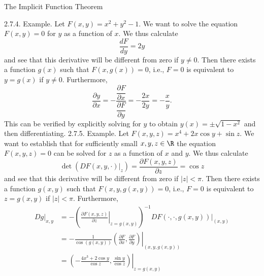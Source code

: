 \documentclass[smaller,hyperref={CJKbookmarks=true}]{beamer}
\begin{document}
\begin{frame}{The Implicit Function Theorem}
\begin{spacing}{1}
\alert{2.7.4. Example.} Let $F(x,y)=x^2+y^2-1$. We want to solve the equation $F(x,y)=0$ for $y$ as a function of $x$. We thus calculate
\[\frac{dF}{dy}=2y\]
and see that this derivative will be dif{}ferent from zero if $y\neq0$. Then there exists a function $g(x)$ such that $F(x,g(x))=0$, i.e., $F=0$ is equivalent to $y=g(x)$ if $y\neq0$. Furthermore,
\[\frac{\partial y}{\partial x}=-\frac{\dfrac{\partial F}{\partial x}}{\dfrac{\partial F}{\partial y}}=-\frac{2x}{2y}=-\frac{x}{y}.\]
This can be verified by explicitly solving for $y$ to obtain $y(x)=\pm\sqrt{1-x^2}$ and then dif{}ferentiating.
\newpage
\alert{2.7.5. Example.} Let $F(x,y,z)=x^4+2x\cos y+\sin z$. We want to establish that for suf{}ficiently small $x,y,z\in\R$ the equation $F(x,y,z)=0$ can be solved for $z$ as a function of $x$ and $y$. We thus calculate
\[\det\left(DF(x,y,\cdot)\big|_z\right)=\frac{\partial F(x,y,z)}{\partial z}=\cos z\]
and see that this derivative will be dif{}ferent from zero if $|z|<\pi$. Then there exists a function $g(x,y)$ such that $F(x,y,g(x,y))=0$, i.e., $F=0$ is equivalent to $z=g(x,y)$ if $|z|<\pi$. Furthermore,
\vspace*{-7pt}
\begin{equation*}
  \begin{split}
     Dg|_{x,y} &=-\left(\left.\frac{\partial F(x,y,z)}{\partial z}\right|_{z=g(x,y)}\right)^{-1}DF(\cdot,\cdot,g(x,y))\big|_{(x,y)} \\
       &=-\frac{1}{\cos(g(x,y))}\left.\left(\frac{\partial F}{\partial x},\frac{\partial F}{\partial y}\right)\right|_{(x,y,g(x,y))}  \\
       &=\left.\left(-\frac{4x^3+2\cos y}{\cos z},\frac{\sin y}{\cos z}\right)\right|_{z=g(x,y)}
  \end{split}
\end{equation*}
\end{spacing}
\end{frame}
\end{document}

